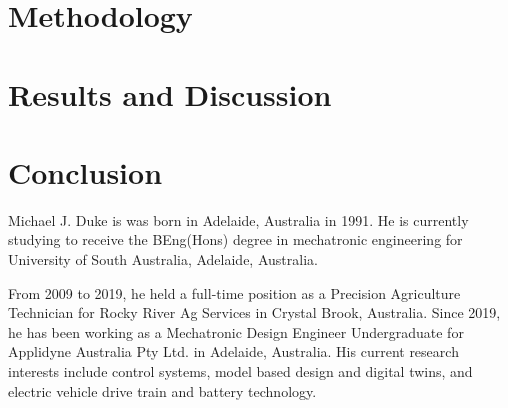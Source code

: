\documentclass{ieeeaccess}
\begin{document}
\section{Methodology}
\label{sec:meth}
	

\section{Results and Discussion}
\label{sec:res}
\FloatBarrier
	
\FloatBarrier
\section{Conclusion}
\label{sec:con}
	

	
	
	
\begin{IEEEbiography}{Michael J. Duke} is was born in Adelaide, Australia in 1991. He is currently studying to receive the BEng(Hons) degree in mechatronic engineering for University of South Australia, Adelaide, Australia.\par
From 2009 to 2019, he held a full-time position as a Precision Agriculture Technician for Rocky River Ag Services in Crystal Brook, Australia. Since 2019, he has been working as a Mechatronic Design Engineer Undergraduate for Applidyne Australia Pty Ltd. in Adelaide, Australia. His current research interests include control systems, model based design and digital twins, and electric vehicle drive train and battery technology.
\end{IEEEbiography}

\EOD
\end{document}
